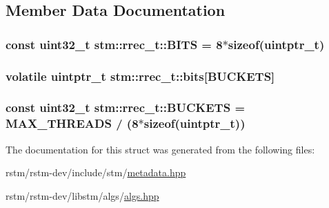 \subsection{Member Data Documentation}
\hypertarget{structstm_1_1rrec__t_aec9e316f7666351329550a2c988ff1ce}{
\subsubsection[{B\-I\-T\-S}]{\setlength{\rightskip}{0pt plus 5cm}const uint32\-\_\-t stm\-::rrec\-\_\-t\-::\-B\-I\-T\-S = 8$\ast$sizeof(uintptr\-\_\-t)\hspace{0.3cm}{\ttfamily [static]}}}\label{structstm_1_1rrec__t_aec9e316f7666351329550a2c988ff1ce}
\hypertarget{structstm_1_1rrec__t_acc2019fab1ebfb8f3302c08ff1d9aab2}{
\subsubsection[{bits}]{\setlength{\rightskip}{0pt plus 5cm}volatile uintptr\-\_\-t stm\-::rrec\-\_\-t\-::bits\mbox{[}{\bf B\-U\-C\-K\-E\-T\-S}\mbox{]}}}\label{structstm_1_1rrec__t_acc2019fab1ebfb8f3302c08ff1d9aab2}
\hypertarget{structstm_1_1rrec__t_a4098b1f07f9d4a391a50ebdb990da8a2}{
\subsubsection[{B\-U\-C\-K\-E\-T\-S}]{\setlength{\rightskip}{0pt plus 5cm}const uint32\-\_\-t stm\-::rrec\-\_\-t\-::\-B\-U\-C\-K\-E\-T\-S = {\bf M\-A\-X\-\_\-\-T\-H\-R\-E\-A\-D\-S} / (8$\ast$sizeof(uintptr\-\_\-t))\hspace{0.3cm}{\ttfamily [static]}}}\label{structstm_1_1rrec__t_a4098b1f07f9d4a391a50ebdb990da8a2}


The documentation for this struct was generated from the following files\-:\begin{DoxyCompactItemize}
\item 
rstm/rstm-\/dev/include/stm/\hyperlink{metadata_8hpp}{metadata.\-hpp}\item 
rstm/rstm-\/dev/libstm/algs/\hyperlink{algs_8hpp}{algs.\-hpp}\end{DoxyCompactItemize}
